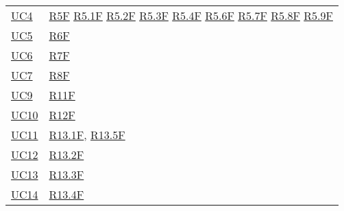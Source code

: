 \begin{center}
\begin{longtable}[!h]{m{50px} m{50px}}
        \hyperref[sec:UC4]{UC4}           & \hyperref[tab:RequisitiFunzionali]{R5F}
        \newline \hyperref[tab:RequisitiFunzionali]{R5.1F}
        \newline \hyperref[tab:RequisitiFunzionali]{R5.2F}
        \newline \hyperref[tab:RequisitiFunzionali]{R5.3F}
        \newline \hyperref[tab:RequisitiFunzionali]{R5.4F}
        \newline \hyperref[tab:RequisitiFunzionali]{R5.6F}
        \newline \hyperref[tab:RequisitiFunzionali]{R5.7F}
        \newline \hyperref[tab:RequisitiFunzionali]{R5.8F}
        \newline \hyperref[tab:RequisitiFunzionali]{R5.9F}                              \\

        \hyperref[sec:UC5]{UC5}           & \hyperref[tab:RequisitiFunzionali]{R6F}     \\

        \hyperref[sec:UC6]{UC6}           & \hyperref[tab:RequisitiFunzionali]{R7F}     \\

        \hyperref[sec:UC7]{UC7}           & \hyperref[tab:RequisitiFunzionali]{R8F}     \\

        \hyperref[sec:UC9]{UC9}           & \hyperref[tab:RequisitiFunzionali]{R11F}    \\

        \hyperref[sec:UC10]{UC10}         & \hyperref[tab:RequisitiFunzionali]{R12F}    \\

        \hyperref[sec:UC11]{UC11}         & \hyperref[tab:RequisitiFunzionali]{R13.1F},
        \newline \hyperref[tab:RequisitiFunzionali]{R13.5F}                             \\

        \hyperref[sec:UC12]{UC12}         & \hyperref[tab:RequisitiFunzionali]{R13.2F}  \\

        \hyperref[sec:UC13]{UC13}         & \hyperref[tab:RequisitiFunzionali]{R13.3F}  \\

        \hyperref[sec:UC14]{UC14}         & \hyperref[tab:RequisitiFunzionali]{R13.4F}  \\


\end{longtable}
\end{center}
